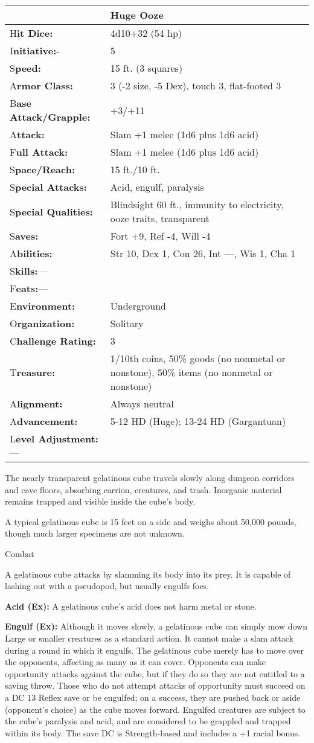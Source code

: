 \documentclass{article}
\begin{document}
\begin{tabular}{|>{\raggedright}p{91pt}|>{\raggedright}p{195pt}|}
\hline
  & Huge Ooze\tabularnewline
\hline
H\textbf{it Dice:} & 4d10+32 (54 hp)\tabularnewline
\hline
I\textbf{nitiative:}- & 5\tabularnewline
\hline
S\textbf{peed:} & 15 ft. (3 squares)\tabularnewline
\hline
A\textbf{rmor Class:} & 3 (-2 size, -5 Dex), touch 3, flat-footed 3\tabularnewline
\hline
B\textbf{ase Attack/Grapple:} & +3/+11\tabularnewline
\hline
A\textbf{ttack:} & Slam +1 melee (1d6 plus 1d6 acid)\tabularnewline
\hline
F\textbf{ull Attack:} & Slam +1 melee (1d6 plus 1d6 acid)\tabularnewline
\hline
S\textbf{pace/Reach:} & 15 ft./10 ft.\tabularnewline
\hline
S\textbf{pecial Attacks:} & Acid, engulf, paralysis\tabularnewline
\hline
S\textbf{pecial Qualities:} & Blindsight 60 ft., immunity to electricity, ooze 
traits, transparent\tabularnewline
\hline
S\textbf{aves:} & Fort +9, Ref -4, Will -4\tabularnewline
\hline
A\textbf{bilities:} & Str 10, Dex 1, Con 26, Int ---, Wis 1, Cha 1\tabularnewline
\hline
S\textbf{kills:}--- & \tabularnewline
\hline
F\textbf{eats:}--- & \tabularnewline
\hline
E\textbf{nvironment:} & Underground\tabularnewline
\hline
O\textbf{rganization:} & Solitary\tabularnewline
\hline
C\textbf{hallenge Rating:} & 3\tabularnewline
\hline
T\textbf{reasure:} & 1/10th coins, 50\% goods (no nonmetal or nonstone), 50\% items 
(no nonmetal or nonstone)\tabularnewline
\hline
A\textbf{lignment:} & Always neutral\tabularnewline
\hline
A\textbf{dvancement:} & 5-12 HD (Huge); 13-24 HD (Gargantuan)\tabularnewline
\hline
L\textbf{evel Adjustment:}--- & \tabularnewline
\hline
\end{tabular}

The nearly transparent gelatinous cube travels slowly along dungeon corridors and 
cave floors, absorbing carrion, creatures, and trash. Inorganic material remains 
trapped and visible inside the cube's body.

A typical gelatinous cube is 15 feet on a side and weighs about 50,000 pounds, 
though much larger specimens are not unknown.

Combat

A gelatinous cube attacks by slamming its body into its prey. It is capable of 
lashing out with a pseudopod, but usually engulfs foes.

\textbf{Acid (Ex):} A gelatinous cube's acid does not harm metal or stone.

\textbf{Engulf (Ex):} Although it moves slowly, a gelatinous cube can simply mow 
down Large or smaller creatures as a standard action. It cannot make a slam attack 
during a round in which it engulfs. The gelatinous cube merely has to move over 
the opponents, affecting as many as it can cover. Opponents can make opportunity 
attacks against the cube, but if they do so they are not entitled to a saving throw. 
Those who do not attempt attacks of opportunity must succeed on a DC 13 Reflex 
save or be engulfed; on a success, they are pushed back or aside (opponent's choice) 
as the cube moves forward. Engulfed creatures are subject to the cube's paralysis 
and acid, and are considered to be grappled and trapped within its body. The save 
DC is Strength-based and includes a +1 racial bonus.
\end{document}
